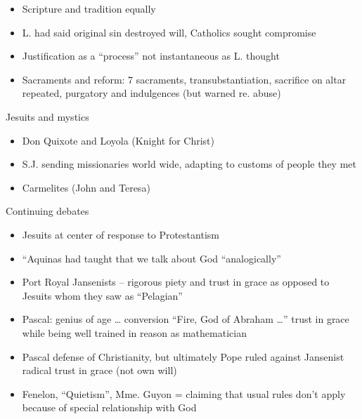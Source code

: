 \begin{frame}[label=sec-4-2]{}
\begin{itemize}
\item Scripture and tradition equally
\item L. had said original sin destroyed will, Catholics sought compromise
\item Justification as a ``process'' not instantaneous as L. thought
\item Sacraments and reform: 7 sacraments, transubstantiation, sacrifice on altar repeated, purgatory and indulgences (but warned re. abuse)
\end{itemize}
\end{frame}

\begin{frame}[label=sec-4-3]{Jesuits and mystics}
\begin{itemize}
\item Don Quixote and Loyola (Knight for Christ)
\item S.J. sending missionaries world wide, adapting to customs of people they met
\item Carmelites (John and Teresa)
\end{itemize}
\end{frame}
\begin{frame}[label=sec-4-4]{Continuing debates}
\begin{itemize}
\item Jesuits at center of response to Protestantism
\item ``Aquinas had taught that we talk about God ``analogically''
\item Port Royal Jansenists -- rigorous piety and trust in grace as opposed to Jesuits whom they saw as ``Pelagian''
\item Pascal: genius of age \ldots{} conversion ``Fire, God of Abraham \ldots{}'' trust in grace while being well trained in reason as mathematician
\item Pascal defense of Christianity, but ultimately Pope ruled against Jansenist radical trust in grace (not own will)
\item Fenelon, ``Quietism'', Mme. Guyon = claiming that usual rules don't apply because of special relationship with God
\end{itemize}
\end{frame}


